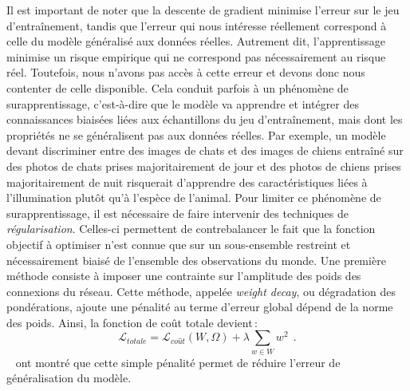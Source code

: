 Il est important de noter que la descente de gradient minimise l'erreur sur le jeu d'entraînement, tandis que l'erreur qui nous intéresse réellement correspond à celle du modèle généralisé aux données réelles. Autrement dit, l'apprentissage minimise un risque empirique qui ne correspond pas nécessairement au risque réel. Toutefois, nous n'avons pas accès à cette erreur et devons donc nous contenter de celle disponible. Cela conduit parfois à un phénomène de surapprentissage, c'est-à-dire que le modèle va apprendre et intégrer des connaissances biaisées liées aux échantillons du jeu d'entraînement, mais dont les propriétés ne se généralisent pas aux données réelles. Par exemple, un modèle devant discriminer entre des images de chats et des images de chiens entraîné sur des photos de chats prises majoritairement de jour et des photos de chiens prises majoritairement de nuit risquerait d'apprendre des caractéristiques liées à l'illumination plutôt qu'à l'espèce de l'animal.
Pour limiter ce phénomène de surapprentissage, il est nécessaire de faire intervenir des techniques de \emph{régularisation}. Celles-ci permettent de contrebalancer le fait que la fonction objectif à optimiser n'est connue que sur un sous-ensemble restreint et nécessairement biaisé de l'ensemble des observations du monde. Une première méthode consiste à imposer une contrainte sur l'amplitude des poids des connexions du réseau. Cette méthode, appelée \emph{weight decay}, ou dégradation des pondérations, ajoute une pénalité au terme d'erreur global dépend de la norme des poids. Ainsi, la fonction de coût totale devient\,:
$$\mathcal{L}_{totale} = \mathcal{L}_{co\hat{u}t}(W, \Omega) + \lambda \sum_{w \in W} w^2~~.$$
~\citet{krogh_simple_1991} ont montré que cette simple pénalité permet de réduire l'erreur de généralisation du modèle.


